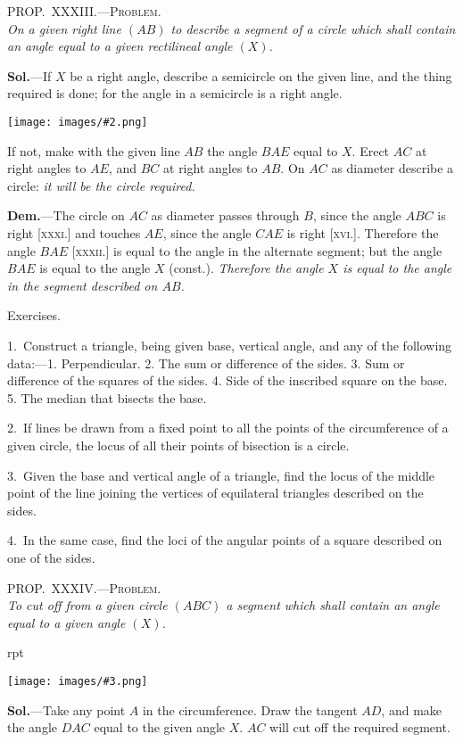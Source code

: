 \documentclass[oneside]{book}
\newcounter{wrapwidth}
\newcommand\myprop[2]{
\bigskip\Needspace*{4\baselineskip}\begin{center}\textsc{#1}\\\medskip\emph{#2}\par\end{center}
}
\newcommand\exhead[1]{
\Needspace*{5\baselineskip}\begin{center}
\textsf{#1}
\end{center}
}
\newcommand\imgflow[3]{
\setcounter{wrapwidth}{#1}
\begin{wrapfigure}[#2]{r}{\value{wrapwidth}pt}
\begin{center}
\vspace{-0.3in}
\texttt{[image: images/\#3.png]}
\end{center}
\end{wrapfigure}
}
\newcommand\imgcent[2]{
\begin{center}
\texttt{[image: images/\#2.png]}
\end{center}
}
\begin{document}
\myprop{PROP\@.~XXXIII\@.---Problem.}{On a given right line $(AB)$ to describe a segment of a
circle which shall contain an angle equal to a given rectilineal
angle $(X)$.}

\textbf{Sol.}---If $X$ be a right angle, describe a semicircle on
the given line, and the thing required is done; for the
angle in a semicircle is a right angle.

\imgcent{290}{f141}

If not, make with the given line $AB$ the angle $BAE$
equal to $X$. Erect $AC$ at right angles to $AE$, and $BC$
at right angles to $AB$. On $AC$ as diameter describe a
circle: \emph{it will be the circle required.}

\textbf{Dem.}---The circle on $AC$ as diameter passes through
$B$, since the angle $ABC$ is right [\textsc{xxxi.}] and touches
$AE$, since the angle $CAE$ is right [\textsc{xvi.}]. Therefore
the angle $BAE$ [\textsc{xxxii.}] is equal to the angle in the
alternate segment; but the angle $BAE$ is equal to the
angle $X$ (const.). \emph{Therefore the angle $X$ is equal to
the angle in the segment described on $AB$.}

\exhead{Exercises.}

\begin{footnotesize}
1.~Construct a triangle, being given base, vertical angle, and
any of the following data:---1. Perpendicular. 2. The sum or
difference of the sides. 3. Sum or difference of the squares of
the sides. 4. Side of the inscribed square on the base. 5. The
median that bisects the base.

2.~If lines be drawn from a fixed point to all the points of the
circumference of a given circle, the locus of all their points of
bisection is a circle.

3.~Given the base and vertical angle of a triangle, find the
locus of the middle point of the line joining the vertices of
equilateral triangles described on the sides.

4.~In the same case, find the loci of the angular points of a
square described on one of the sides.
\par\end{footnotesize}

\myprop{PROP\@.~XXXIV\@.---Problem.}{To cut off from a given circle $(ABC)$ a segment which
shall contain an angle equal to a given angle $(X)$.}

\imgflow{140}{9}{f142}

\textbf{Sol.}---Take any point $A$ in the circumference. Draw
the tangent $AD$, and make the
angle $DAC$ equal to the given
angle $X$. $AC$ will cut off the
required segment.
\end{document}
